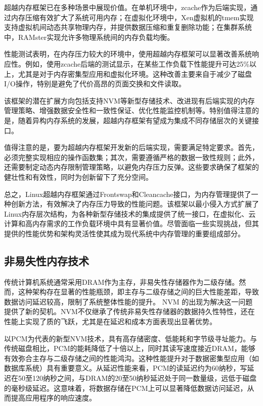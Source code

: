 超越内存框架已在多种场景中展现价值。在单机环境中，zcache作为后端实现，通过内存压缩有效扩大了系统可用内存；在虚拟化环境中，Xen虚拟机的tmem实现支持虚拟机间动态共享物理内存，并提供数据压缩和重复删除功能；在集群系统中，RAMster实现允许多物理系统间的内存负载均衡。

性能测试表明，在内存压力较大的环境中，使用超越内存框架可以显著改善系统响应性。例如，使用zcache后端的测试显示，在某些工作负载下性能提升可达25\%以上，尤其是对于内存密集型应用和虚拟化环境。这种改善主要来自于减少了磁盘I/O操作，特别是避免了代价高昂的页面交换和文件读取。

该框架的潜在扩展方向包括支持NVM等新型存储技术、改进现有后端实现的内存管理策略、增强数据安全性和一致性保证、优化性能监控机制等。特别值得注意的是，随着异构内存系统的发展，超越内存框架有望成为集成不同存储层次的关键接口。

值得注意的是，要为超越内存框架开发新的后端实现，需要满足特定要求。首先，必须完整实现相应的操作函数集；其次，需要遵循严格的数据一致性规则；此外，还需要制定动态内存限制管理策略，以避免内存压力反弹。这些要求确保了框架的健壮性和有效性，同时为创新留下了充分空间。

总之，Linux超越内存框架通过Frontswap和Cleancache接口，为内存管理提供了一种创新方法，有效解决了内存压力导致的性能问题。该框架以最小侵入方式扩展了Linux内存层次结构，为各种新型存储技术的集成提供了统一接口，在虚拟化、云计算和高内存需求的工作负载环境中具有显著价值。尽管面临一些实现挑战，但其提供的性能优势和架构灵活性使其成为现代系统中内存管理的重要组成部分。

\subsection{非易失性内存技术}

传统计算机系统通常采用DRAM作为主存，非易失性存储器作为二级存储。然而，这种架构存在显著的性能瓶颈，即主存与二级存储之间的巨大性能差距，导致数据访问延迟较高，限制了系统整体性能的提升。 NVM 的出现为解决这一问题提供了新的契机。NVM不仅继承了传统非易失性存储器的数据持久性特性，还在性能上实现了质的飞跃，尤其是在延迟和成本方面表现出显著优势。

以PCM为代表的新型NVM技术，具有高存储密度、低能耗和字节级寻址能力。与传统磁盘相比，PCM的能耗降低了十倍以上，同时其读写速度接近DRAM，能够有效弥合主存与二级存储之间的性能鸿沟。这种性能提升对于数据密集型应用（如数据库系统）具有重要意义。从延迟性能来看，PCM的读延迟约为60纳秒，写延迟在50至120纳秒之间，与DRAM的20至50纳秒延迟处于同一数量级，远低于磁盘的毫秒级延迟。这意味着，将数据存储在PCM上可以显著降低数据访问延迟，从而提高应用程序的响应速度。

